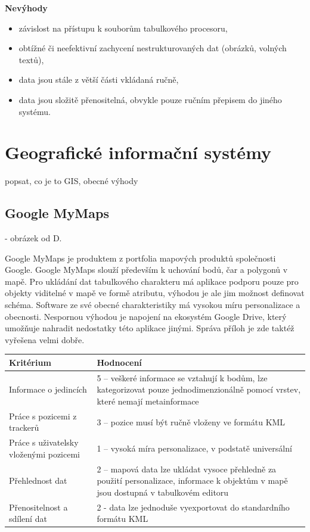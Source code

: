 \textbf{Nevýhody}

\begin{itemize}
	\item závislost na přístupu k souborům tabulkového procesoru,
	\item obtížné či neefektivní zachycení nestrukturovaných dat (obrázků, volných textů),
	\item data jsou stále z větší části vkládaná ručně,
	\item data jsou složitě přenositelná, obvykle pouze ručním přepisem do jiného systému.
\end{itemize}

\section{Geografické informační systémy}

popsat, co je to GIS, obecné výhody

\subsection{Google MyMaps}

- obrázek od D.

Google MyMaps je produktem z portfolia mapových produktů společnosti Google. Google MyMaps slouží především k uchování bodů, čar a polygonů v mapě. Pro ukládání dat tabulkového charakteru má aplikace podporu pouze pro objekty viditelné v mapě ve formě atributu, výhodou je ale jim možnost definovat schéma. Software ze své obecné charakteristiky má vysokou míru personalizace a obecnosti. Nespornou výhodou je napojení na ekosystém Google Drive, který umožňuje nahradit nedostatky této aplikace jinými. Správa příloh je zde taktéž vyřešena velmi dobře.

\begin{table}[h]
	\begin{tabular}{ l | l }
		Kritérium                              & Hodnocení \\
		\hline			
		Informace o jedincích                  & 5 -- veškeré informace se vztahují k bodům, lze kategorizovat pouze jednodimenzionálně pomocí vrstev, které nemají metainformace          \\
		Práce s pozicemi z trackerů            & 3 -- pozice musí být ručně vloženy ve formátu KML          \\
		Práce s uživatelsky vloženými pozicemi & 1 -- vysoká míra personalizace, v podstatě universální          \\
		Přehlednost dat                        & 2 -- mapová data lze ukládat vysoce přehledně za použití personalizace, informace k objektům v mapě jsou dostupná v tabulkovém editoru          \\
		Přenositelnost a sdílení dat           & 2 - data lze jednoduše vyexportovat do standardního formátu KML          \\
		\hline	
	\end{tabular}
\end{table}

